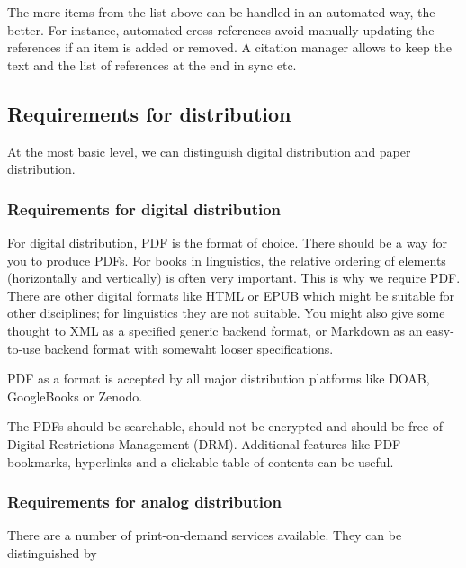\documentclass[nonflat,modfonts,output=book] {langsci/langscibook}
\begin{document}
The more items from the list above can be handled in an automated way, the better. For instance, automated cross-references avoid manually updating the references if an item is added or removed. A citation manager allows to keep the text and the list of references at the end in sync etc. 
                        
                        
                        
\subsection{Requirements for distribution}
At the most basic level, we can distinguish digital distribution and paper distribution. 

\subsubsection{Requirements for digital distribution}
For digital distribution, PDF is the format of choice. There should be a way for you to produce PDFs.  For books in linguistics, the relative ordering of elements (horizontally and vertically) is often very important. This is why we require PDF. There are other digital formats like HTML or EPUB which might be suitable for other disciplines; for linguistics they are not suitable. You might also give some thought to XML as a specified generic backend format, or Markdown as an easy-to-use backend format with somewaht looser specifications. 

PDF as a format is accepted by all major distribution platforms like DOAB, GoogleBooks or Zenodo. 
 

The PDFs should be searchable, should not be encrypted and should be free of Digital Restrictions Management (DRM). Additional features like PDF bookmarks, hyperlinks and a clickable table of contents can be useful. 

\subsubsection{Requirements for analog distribution}
There are a number of print-on-demand services available. They can be distinguished by 
\end{document}
